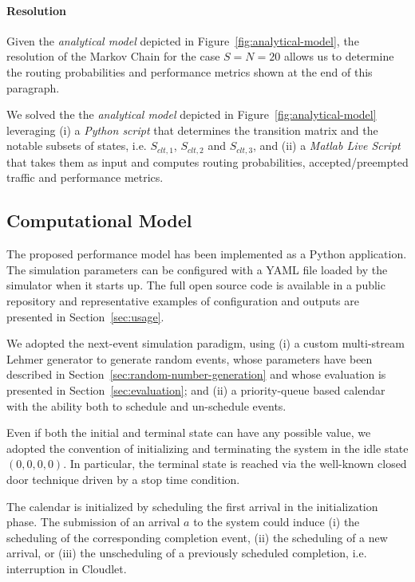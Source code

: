 \paragraph{Resolution}
Given the \textit{analytical model} depicted in Figure~\ref{fig:analytical-model}, the resolution of the Markov Chain for the case $S=N=20$ allows us to determine the routing probabilities and performance metrics shown at the end of this paragraph.

We solved the the \textit{analytical model} depicted in Figure~\ref{fig:analytical-model} leveraging (i) a \textit{Python script} that determines the transition matrix and the notable subsets of states, i.e. $S_{clt,1}$, $S_{clt,2}$ and $S_{clt,3}$, and (ii) a \textit{Matlab Live Script} that takes them as input and computes routing probabilities, accepted/preempted traffic and performance metrics.



\subsection{Computational Model}
The proposed performance model has been implemented as a Python application. 
The simulation parameters can be configured with a YAML file loaded by the simulator when it starts up.
The full open source code is available in a public repository \cite{gmarciani-pydes} and representative examples of configuration and outputs are presented in Section~\ref{sec:usage}.

We adopted the next-event simulation paradigm, using 
(i) a custom multi-stream Lehmer generator to generate random events, whose parameters have been described in Section~\ref{sec:random-number-generation} and whose evaluation is presented in Section~\ref{sec:evaluation}; and
(ii) a priority-queue based calendar with the ability both to schedule and un-schedule events.

Even if both the initial and terminal state can have any possible value, we adopted the convention of initializing and terminating the system in the idle state $(0,0,0,0)$. In particular, the terminal state is reached via the well-known closed door technique driven by a stop time condition.

The calendar is initialized by scheduling the first arrival in the initialization phase. The submission of an arrival $a$ to the system could induce
(i) the scheduling of the corresponding completion event,
(ii) the scheduling of a new arrival, or
(iii) the unscheduling of a previously scheduled completion, i.e. interruption in Cloudlet.

